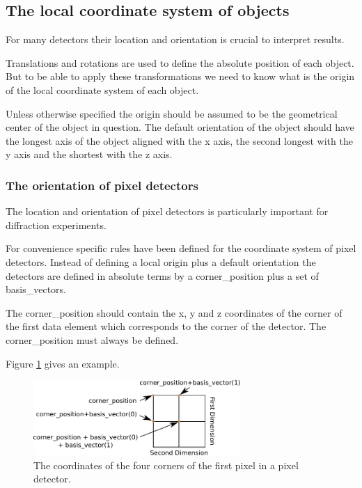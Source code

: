 \documentclass[usletter,11pt]{article}
\begin{document}
\subsection{The local coordinate system of objects}
\label{originOfObjects}

For many detectors their location and orientation is crucial to
interpret results. 

Translations and rotations are used to define
the absolute position of each object. But to be able to apply these
transformations we need to know what is the origin of the local
coordinate system of each object.

Unless otherwise specified the origin should be assumed to be the
geometrical center of the object in question. The default orientation
of the object should have the longest axis of the object aligned with
the x axis, the second longest with the y axis and the shortest with
the z axis.

\subsubsection{The orientation of pixel detectors}
\label{ccd_orientation}

The location and orientation of pixel detectors is particularly important for
diffraction experiments.

For convenience specific rules have been defined for the coordinate
system of pixel detectors. Instead of defining a local origin plus a
default orientation the detectors are defined in absolute terms by a
corner\_position plus a set of basis\_vectors.

The corner\_position should contain the x, y and z coordinates of the corner of
the first data element which corresponds to the corner of the
detector. The corner\_position must always be defined.
  
Figure \ref{fig:detector_coordinates} gives an example.

\begin{figure}[h!]
  \centering
  \includegraphics[width=0.7\textwidth]{detector_coordinates.pdf}
  \caption{The coordinates of the four corners of the first pixel in a
    pixel detector.}
  \label{fig:detector_coordinates}
\end{figure}
\end{document}
